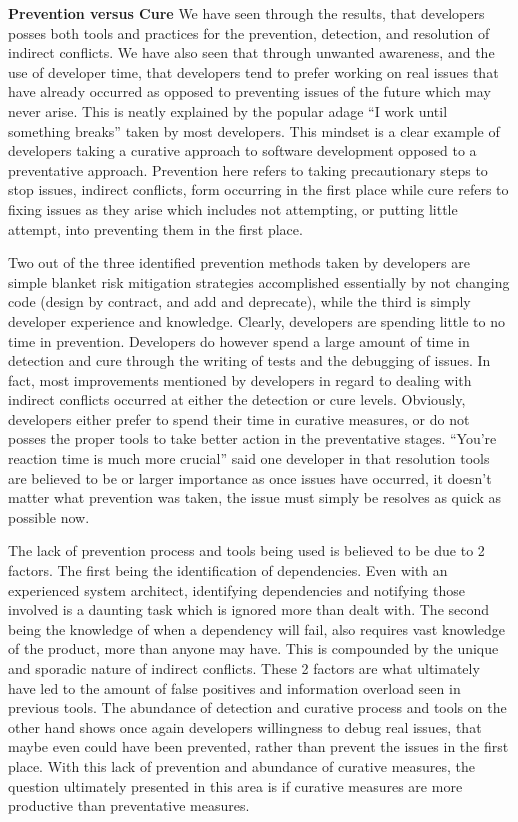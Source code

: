\documentclass[conference]{IEEEtran}
\begin{document}
\textbf{Prevention versus Cure} We have seen through the results, that developers posses both tools and practices for the prevention,
detection, and resolution of indirect conflicts. We have also seen that through unwanted awareness, and the use of developer time,
that developers tend to prefer working on real issues that have already occurred as opposed to preventing issues of the future which
may never arise. This is neatly explained by the popular adage ``I work until something breaks'' taken by most developers. This mindset
is a clear example of developers taking a curative approach to software development opposed to a preventative approach.
Prevention here refers to taking precautionary steps to stop issues, indirect conflicts, form occurring in the first
place while cure refers to fixing issues as they arise which includes not attempting, or putting little attempt, into preventing
them in the first place.

Two out of the three identified prevention methods taken by developers are simple blanket risk mitigation strategies
accomplished essentially by
not changing code (design by contract, and add and deprecate), while the third is simply developer experience and knowledge. Clearly,
developers are spending little to no time in prevention. Developers do however spend a large amount of time in detection and cure through the
writing of tests and the debugging of issues. In fact, most improvements mentioned by developers in regard to dealing with indirect
conflicts occurred at either the detection or cure levels. Obviously, developers either prefer to spend their time in curative
measures, or do not posses the proper tools to take better action in the preventative stages. ``You're reaction time is much more crucial''
said one developer in that resolution tools are believed to be or larger importance as once issues have occurred, it doesn't
matter what prevention was taken, the issue must simply be resolves as quick as possible now.

The lack of prevention process and tools being used is believed to be due to 2 factors. The first being the identification of dependencies.
Even with an experienced system architect, identifying dependencies and notifying those involved is a daunting task 
which is ignored more than dealt with. The second being the knowledge of when a dependency will fail, also requires vast knowledge
of the product, more than anyone may have. This is compounded by the unique and sporadic nature of indirect conflicts. These 2 factors
are what ultimately have led to the amount of false positives and information overload seen in previous tools. The
abundance of detection and curative process and tools on the other hand shows once again developers willingness to debug
real issues, that maybe even could have been prevented, rather than prevent the issues in the first place. With
this lack of prevention and abundance of curative measures, the question ultimately presented in this area is if 
curative measures are more productive than preventative measures.
\end{document}
